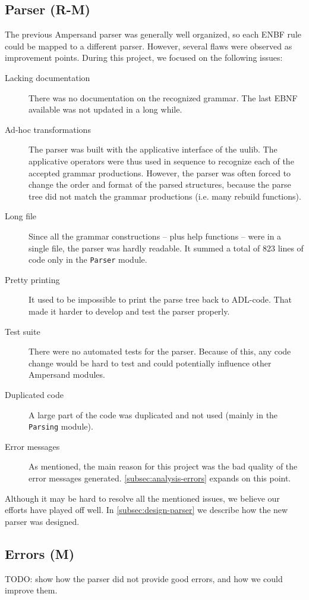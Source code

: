 \subsection{Parser (R-M)}
\label{subsec:analysis-parser}
The previous Ampersand parser was generally well organized, so each ENBF rule could be mapped to a different parser.
However, several flaws were observed as improvement points.
During this project, we focused on the following issues:
\begin{description}
  \item[Lacking documentation]
    There was no documentation on the recognized grammar.
    The last EBNF available was not updated in a long while.
  
  \item[Ad-hoc transformations]
    The parser was built with the applicative interface of the uulib.
    The applicative operators were thus used in sequence to recognize each of the accepted grammar productions.
    However, the parser was often forced to change the order and format of the parsed structures, because the parse tree did not match the grammar productions (i.e. many rebuild functions).
    
  \item[Long file]
    Since all the grammar constructions -- plus help functions -- were in a single file, the parser was hardly readable.
    It summed a total of 823 lines of code only in the \texttt{Parser} module.
  
  \item[Pretty printing]
    It used to be impossible to print the parse tree back to ADL-code.
    That made it harder to develop and test the parser properly.
  
  \item[Test suite]
    There were no automated tests for the parser.
    Because of this, any code change would be hard to test and could potentially influence other Ampersand modules.
  
  \item[Duplicated code]
    A large part of the code was duplicated and not used (mainly in the \texttt{Parsing} module).
  
  \item[Error messages]
    As mentioned, the main reason for this project was the bad quality of the error messages generated.
    \autoref{subsec:analysis-errors} expands on this point.
\end{description}
%
Although it may be hard to resolve all the mentioned issues, we believe our efforts have played off well.
In \autoref{subsec:design-parser} we describe how the new parser was designed.

\subsection{Errors (M)}
\label{subsec:analysis-errors}
TODO: show how the parser did not provide good errors, and how we could improve them.
